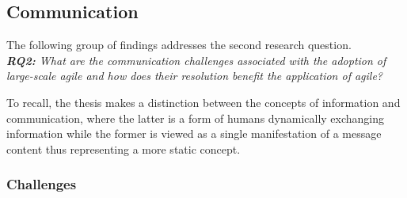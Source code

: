 \subsection{Communication}

The following group of findings addresses the second research question.\\
\textit{\textbf{RQ2:} What are the communication challenges associated with the adoption of large-scale agile and how does their resolution benefit the application of agile?}

To recall, the thesis makes a distinction between the concepts of information and communication, where the latter is a form of humans dynamically exchanging information while the former is viewed as a single manifestation of a message content thus representing a more static concept.

\subsubsection{Challenges}

